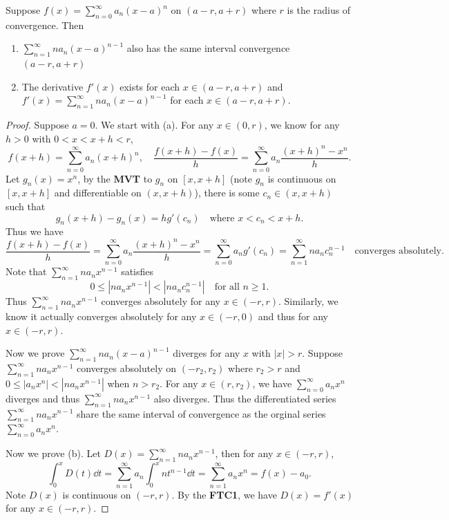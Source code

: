 \documentclass[a4paper]{ctexart}
\begin{document}
    \begin{mythm}\label{diff_power_series}
        Suppose $f(x) = \displaystyle \sum_{n=0}^\infty a_n (x-a)^n$ on $(a-r,a+r)$ where $r$ is the radius of convergence. Then 
        \begin{enumerate}[label=(\alph*)]
            \item $\displaystyle \sum_{n=1}^\infty n a_n (x-a)^{n-1}$ also has the same interval convergence $(a-r,a+r)$
            \item The derivative $f'(x) $ exists for each $x\in (a-r,a+r)$ and $f'(x) = \displaystyle \sum_{n=1}^\infty n a_n (x-a)^{n-1}$ for each $x\in (a-r,a+r)$.
        \end{enumerate}
    \end{mythm}
    \begin{proof}
        Suppose $a=0$. We start with (a). For any $x\in (0,r)$, we know for any $h>0$ with $0<x<x+h<r$,
        \[
        f(x+h) = \sum_{n=0}^\infty a_n (x+h)^n, \quad \frac{f(x+h)-f(x)}{h} = \sum_{n=0}^\infty a_n \frac{(x+h)^n - x^n}{h}.
        \]
        Let $g_n(x) = x^n$, by the \textbf{MVT} to $g_n$ on $[x,x+h]$ (note $g_n$ is continuous on $[x,x+h]$ and differentiable on $(x,x+h)$), there is some $c_n \in (x,x+h)$ such that
        \[
        g_n(x+h) - g_n(x) = h g'(c_n) \quad \text{where } x<c_n<x+h.
        \]
        Thus we have
        \[
        \frac{f(x+h)-f(x)}{h} = \sum_{n=0}^\infty a_n \frac{(x+h)^n - x^n}{h} = \sum_{n=0}^\infty a_n g'(c_n) = \sum_{n=1}^\infty n a_n c_n^{n-1}\quad \text{converges absolutely}.
        \]
        Note that $\displaystyle \sum_{n=1}^\infty n a_n x^{n-1}$ satisfies
        \[
        0 \le | n a_n x^{n-1}| < |n a_n c_n^{n-1}| \quad \text{for all } n\ge 1.
        \]
        Thus $\displaystyle \sum_{n=1}^\infty n a_n x^{n-1}$ converges absolutely for any $x\in (-r,r)$. Similarly, we know it actually converges absolutely for any $x\in (-r,0)$ and thus for any $x\in (-r,r)$.

        Now we prove $\displaystyle \sum_{n=1}^\infty n a_n (x-a)^{n-1}$ diverges for any $x$ with $|x| > r$. Suppose $\displaystyle \sum_{n=1}^\infty n a_n x^{n-1}$ converges absolutely on $(-r_2,r_2)$ where $r_2 > r$ and $0\le |a_n x^n| < |n a_n x^{n-1}|$ when $n>r_2$. For any $x\in (r,r_2)$, we have $\displaystyle \sum_{n=0}^\infty a_n x^n$ diverges and thus $\displaystyle \sum_{n=1}^\infty n a_n x^{n-1}$ also diverges. Thus the differentiated series $\displaystyle \sum_{n=1}^\infty n a_n x^{n-1}$ share the same interval of convergence as the orginal series $\displaystyle \sum_{n=0}^\infty a_n x^n$.

        Now we prove (b). Let $D(x) = \displaystyle \sum_{n=1}^\infty n a_n x^{n-1}$, then for any $x\in (-r,r)$,
        \[
        \int_0^x D(t) \dd t = \sum_{n=1}^{\infty} a_n \int_0^x n t^{n-1} \dd t = \sum_{n=1}^\infty a_n x^n = f(x)-a_0.
        \]
        Note $D(x)$ is continuous on $(-r,r)$. By the \textbf{FTC1}, we have $D(x) = f'(x)$ for any $x\in (-r,r)$.
    \end{proof}
\end{document}

